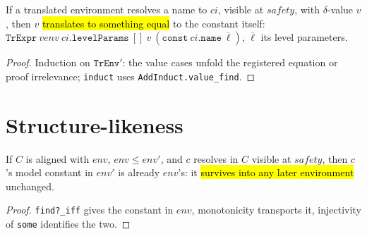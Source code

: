 \begin{theorem}
\label{thm:tr-env-of-value}
\leanok
{}

 If a translated environment resolves a name to $ci$, visible at $safety$,
with $\delta$-value $v$, then $v$ \hl{translates to something equal} to the constant
itself: $\mathtt{TrExpr}\ venv\ ci.\mathtt{levelParams}\ []\ v\ (\mathtt{const}\
ci.\mathtt{name}\ \overline{\ell})$, $\overline{\ell}$ its level parameters.
\end{theorem}
\begin{proof}
\leanok
{} Induction on $\mathtt{TrEnv}'$: the value cases unfold the registered
equation or proof irrelevance; \texttt{induct} uses \texttt{AddInduct.value\_find}.
\end{proof}

\section{Structure-likeness}

\begin{lemma}
\label{thm:aligned-constants-pull}
\leanok
{}

 If $C$ is aligned with $env$, $env \le env'$, and $c$ resolves in $C$
visible at $safety$, then $c$'s model constant in $env'$ is already $env$'s: it
\hl{survives into any later environment} unchanged.
\end{lemma}
\begin{proof}
\leanok
{} \texttt{find?\_iff} gives the constant in $env$, monotonicity transports it,
injectivity of \texttt{some} identifies the two.
\end{proof}

